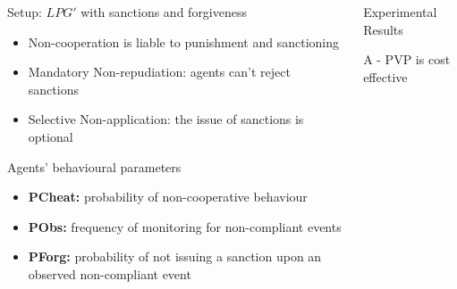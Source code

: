 \documentclass[xcolor={table}]{beamer}
\begin{document}
\begin{frame}[fragile=singleslide,t]
\begin{columns}[T]
\begin{column}{.47\textwidth}
\begin{block}{Setup: $LPG'$ with sanctions and forgiveness}
\begin{itemize}
\begin{itemize}
    \item Non-cooperation is liable to punishment and sanctioning
    \item Mandatory Non-repudiation: agents can't reject sanctions
    \item Selective Non-application: the issue of sanctions is optional
\end{itemize}
\end{itemize}
\end{block}

\begin{block}{Agents' behavioural parameters}
\begin{itemize}
    \item \textbf{PCheat:} probability of non-cooperative behaviour
    \item \textbf{PObs:} frequency of monitoring for non-compliant events
    \item \textbf{PForg:} probability of not issuing a sanction upon an observed non-compliant event
\end{itemize}

\end{block}

\end{column}


\begin{column}{.47\textwidth}


\begin{block}{Experimental Results}
\end{block}

\begin{block}{A - PVP is cost effective}



\end{block}
\end{column}
\end{columns}
\end{frame}
\end{document}
